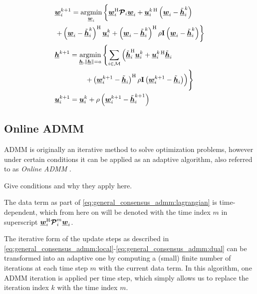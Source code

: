 \documentclass{article}
\newcommand{\hf}{\underline{\bm{h}}}
\newcommand{\wf}{\underline{\bm{w}}}
\newcommand{\uuf}{\underline{\bm{u}}}
\newcommand{\aRhof}{\bm{\mathcal{P}}}
\newcommand{\I}{\mtxb{I}}
\newcommand{\Mset}{\mathcal{M}}
\begin{document}
\begin{align}
    &\wf_i^{k+1} = \underset{\wf_i}{\operatorname{argmin}} \left\{ \wf_i^\herm \aRhof_i \wf_i + \uuf_i^{k\,\herm} \left(\wf_i - \tilde{\hf}_i^{k}\right) \vphantom{+ \left\| \wf_i - \tilde{\hf}_i^{k} \right\|^2}\right.\nonumber\\
    &\left.+ \left(\wf_i - \tilde{\hf}_i^{k}\right)^\herm \uuf_i^{k} + \left( \wf_i - \tilde{\hf}_i^{k} \right)^\herm \rho \I \left( \wf_i - \tilde{\hf}_i^{k} \right) \right\}\label{eq:general_consensus_admm:local}\\
    &\hf^{k+1} = \underset{\hf, \|\hf\| = a}{\operatorname{argmin}} \left\{ \sum_{i \in \Mset} \left( \tilde{\hf}_i^{\herm} \uuf_i^{k} + \uuf_i^{k\,\herm} \tilde{\hf}_i \vphantom{\frac{\rho}{2} \| \wf_i^{k+1} - \tilde{\hf}_i \|^2} \right.\right.\nonumber\\
    &\left. \qquad \qquad \vphantom{\sum_{i=1}^{M} pp } \left.+ \left( \wf_i^{k+1} - \tilde{\hf}_i \right)^\herm \rho \I \left( \wf_i^{k+1} - \tilde{\hf}_i \right)  \right) \right\}\label{eq:general_consensus_admm:global}\\
    &\uuf_i^{k+1} = \uuf_i^{k} + \rho \left( \wf_i^{k+1} - \tilde{\hf}_i^{k+1} \right)\label{eq:general_consensus_admm:dual}
\end{align}

\subsection{Online ADMM}
\label{ssec:online_admm}
ADMM is originally an iterative method to solve optimization problems, however under certain conditions it can be applied as an adaptive algorithm, also referred to as \emph{Online ADMM} \cite{}.
\begin{attention}
    Give conditions and why they apply here.
\end{attention}
The data term as part of \eqref{eq:general_consensus_admm:lagrangian} is time-dependent, which from here on  will be denoted with the time index \(m\) in superscript \(\wf_i^\herm \aRhof_i^{m} \wf_i\).

The iterative form of the update steps as described in \eqref{eq:general_consensus_admm:local}-\eqref{eq:general_consensus_admm:dual} can be transformed into an adaptive one by computing a (small) finite number of iterations at each time step \(m\) with the current data term.
In this algorithm, one ADMM iteration is applied per time step, which simply allows us to replace the iteration index \(k\) with the time index \(m\).
\end{document}
